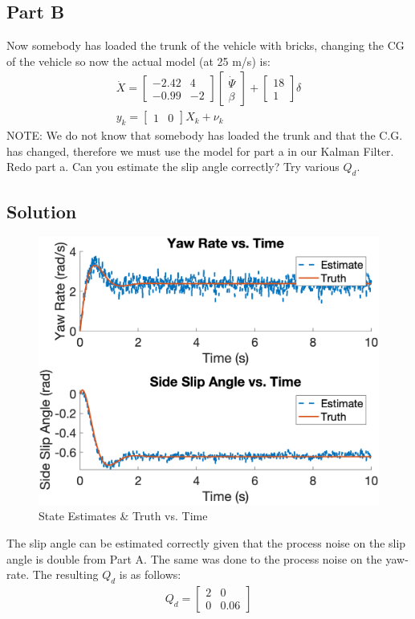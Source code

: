 \documentclass{article}
\begin{document}
\subsection*{Part B}
Now somebody has loaded the trunk of the vehicle with bricks, changing the CG of the vehicle so now the actual model (at 25 m/s) is:
\begin{gather}
    \dot{X} = \begin{bmatrix}
        -2.42 &  4 \\
        -0.99 & -2
    \end{bmatrix}\begin{bmatrix}
        \dot{\Psi} \\
        \beta
    \end{bmatrix} + \begin{bmatrix}
        18 \\
        1
    \end{bmatrix}\delta \\
    y_k = \begin{bmatrix}
        1 & 0
    \end{bmatrix}X_k + \nu_k 
\end{gather}
NOTE: We do not know that somebody has loaded the trunk and that the C.G. has changed, therefore we must use the model for part a in our Kalman Filter.\\
Redo part a. Can you estimate the slip angle correctly? Try various $Q_d$.
\subsection*{Solution}
\begin{figure}[H]
    \centering
    \includegraphics[width=0.75\linewidth]{../figures/p4b_kf.png}
    \caption{State Estimates \& Truth vs. Time}\label{fig:p4b_kf}
\end{figure}
The slip angle can be estimated correctly given that the process noise on the slip angle is double from Part A.  The same was done to the process noise on the yaw-rate.  The resulting $Q_d$ is as follows:
\begin{gather*}
    Q_d = \begin{bmatrix}
        2 & 0\\
        0 & 0.06
    \end{bmatrix}
\end{gather*}
\end{document}
